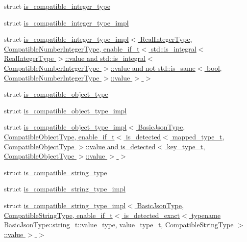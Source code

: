 \begin{DoxyCompactItemize}
\item 
struct \hyperlink{structnlohmann_1_1detail_1_1is__compatible__integer__type}{is\+\_\+compatible\+\_\+integer\+\_\+type}
\item 
struct \hyperlink{structnlohmann_1_1detail_1_1is__compatible__integer__type__impl}{is\+\_\+compatible\+\_\+integer\+\_\+type\+\_\+impl}
\item 
struct \hyperlink{structnlohmann_1_1detail_1_1is__compatible__integer__type__impl_3_01_real_integer_type_00_01_com5aa74bcf254245a639da00509f4d2655}{is\+\_\+compatible\+\_\+integer\+\_\+type\+\_\+impl$<$ Real\+Integer\+Type, Compatible\+Number\+Integer\+Type, enable\+\_\+if\+\_\+t$<$ std\+::is\+\_\+integral$<$ Real\+Integer\+Type $>$\+::value and std\+::is\+\_\+integral$<$ Compatible\+Number\+Integer\+Type $>$\+::value and not std\+::is\+\_\+same$<$ bool, Compatible\+Number\+Integer\+Type $>$\+::value $>$ $>$}
\item 
struct \hyperlink{structnlohmann_1_1detail_1_1is__compatible__object__type}{is\+\_\+compatible\+\_\+object\+\_\+type}
\item 
struct \hyperlink{structnlohmann_1_1detail_1_1is__compatible__object__type__impl}{is\+\_\+compatible\+\_\+object\+\_\+type\+\_\+impl}
\item 
struct \hyperlink{structnlohmann_1_1detail_1_1is__compatible__object__type__impl_3_01_basic_json_type_00_01_compatfbe9a153c4ecce445c98bbdd2d65f605}{is\+\_\+compatible\+\_\+object\+\_\+type\+\_\+impl$<$ Basic\+Json\+Type, Compatible\+Object\+Type, enable\+\_\+if\+\_\+t$<$ is\+\_\+detected$<$ mapped\+\_\+type\+\_\+t, Compatible\+Object\+Type $>$\+::value and is\+\_\+detected$<$ key\+\_\+type\+\_\+t, Compatible\+Object\+Type $>$\+::value $>$ $>$}
\item 
struct \hyperlink{structnlohmann_1_1detail_1_1is__compatible__string__type}{is\+\_\+compatible\+\_\+string\+\_\+type}
\item 
struct \hyperlink{structnlohmann_1_1detail_1_1is__compatible__string__type__impl}{is\+\_\+compatible\+\_\+string\+\_\+type\+\_\+impl}
\item 
struct \hyperlink{structnlohmann_1_1detail_1_1is__compatible__string__type__impl_3_01_basic_json_type_00_01_compat6590904cab40fc73f430e4c7518179a2}{is\+\_\+compatible\+\_\+string\+\_\+type\+\_\+impl$<$ Basic\+Json\+Type, Compatible\+String\+Type, enable\+\_\+if\+\_\+t$<$ is\+\_\+detected\+\_\+exact$<$ typename Basic\+Json\+Type\+::string\+\_\+t\+::value\+\_\+type, value\+\_\+type\+\_\+t, Compatible\+String\+Type $>$\+::value $>$ $>$}
\item 

\end{DoxyCompactItemize}
